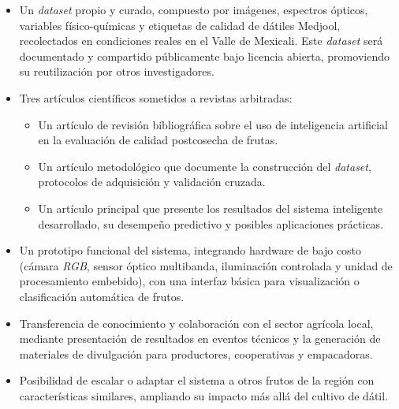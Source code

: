\begin{itemize}
    \item Un \textit{dataset} propio y curado, compuesto por imágenes, espectros ópticos, variables físico-químicas y etiquetas de calidad de dátiles Medjool, recolectados en condiciones reales en el Valle de Mexicali. Este \textit{dataset} será documentado y compartido públicamente bajo licencia abierta, promoviendo su reutilización por otros investigadores.
    \item Tres artículos científicos sometidos a revistas arbitradas:
    \begin{itemize}
        \item Un artículo de revisión bibliográfica sobre el uso de inteligencia artificial en la evaluación de calidad postcosecha de frutas.
        \item Un artículo metodológico que documente la construcción del \textit{dataset}, protocolos de adquisición y validación cruzada.
        \item Un artículo principal que presente los resultados del sistema inteligente desarrollado, su desempeño predictivo y posibles aplicaciones prácticas.
    \end{itemize}
    \item Un prototipo funcional del sistema, integrando hardware de bajo costo (cámara \textit{RGB}, sensor óptico multibanda, iluminación controlada y unidad de procesamiento embebido), con una interfaz básica para visualización o clasificación automática de frutos.
    \item Transferencia de conocimiento y colaboración con el sector agrícola local, mediante presentación de resultados en eventos técnicos y la generación de materiales de divulgación para productores, cooperativas y empacadoras.
    \item Posibilidad de escalar o adaptar el sistema a otros frutos de la región con características similares, ampliando su impacto más allá del cultivo de dátil.
\end{itemize}